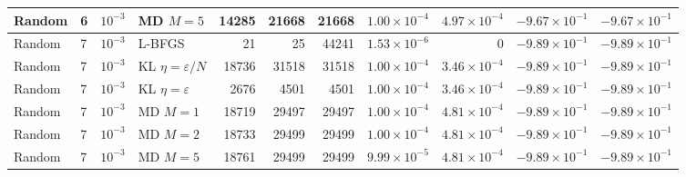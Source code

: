 \begin{table}[t]
\begin{tabular}{llllrrrrrrr}
Random & 6 & $10^{-3}$ & MD $M=5$ & 14285 & 21668 & 21668 & $1.00\times 10^{-4}$ & $4.97\times 10^{-4}$ & $-9.67\times 10^{-1}$ & $-9.67\times 10^{-1}$ \\
\midrule
Random & 7 & $10^{-3}$ & L-BFGS & 21 & 25 & 44241 & $1.53\times 10^{-6}$ & 0 & $-9.89\times 10^{-1}$ & $-9.89\times 10^{-1}$ \\
Random & 7 & $10^{-3}$ & KL $\eta=\varepsilon/N$ & 18736 & 31518 & 31518 & $1.00\times 10^{-4}$ & $3.46\times 10^{-4}$ & $-9.89\times 10^{-1}$ & $-9.89\times 10^{-1}$ \\
Random & 7 & $10^{-3}$ & KL $\eta=\varepsilon$ & 2676 & 4501 & 4501 & $1.00\times 10^{-4}$ & $3.46\times 10^{-4}$ & $-9.89\times 10^{-1}$ & $-9.89\times 10^{-1}$ \\
Random & 7 & $10^{-3}$ & MD $M=1$ & 18719 & 29497 & 29497 & $1.00\times 10^{-4}$ & $4.81\times 10^{-4}$ & $-9.89\times 10^{-1}$ & $-9.89\times 10^{-1}$ \\
Random & 7 & $10^{-3}$ & MD $M=2$ & 18733 & 29499 & 29499 & $1.00\times 10^{-4}$ & $4.81\times 10^{-4}$ & $-9.89\times 10^{-1}$ & $-9.89\times 10^{-1}$ \\
Random & 7 & $10^{-3}$ & MD $M=5$ & 18761 & 29499 & 29499 & $9.99\times 10^{-5}$ & $4.81\times 10^{-4}$ & $-9.89\times 10^{-1}$ & $-9.89\times 10^{-1}$ \\
\bottomrule
\end{tabular}
\end{table}